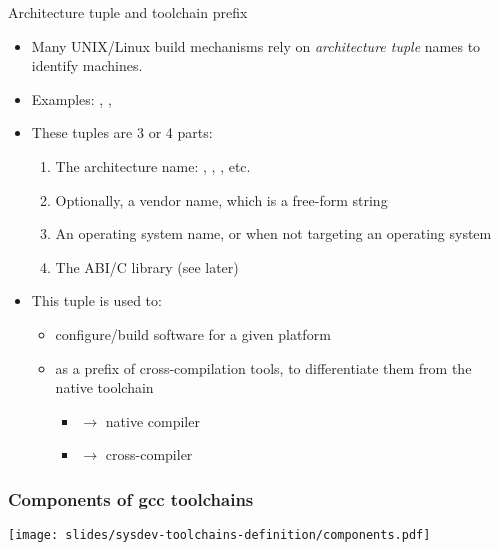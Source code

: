 \begin{frame}{Architecture tuple and toolchain prefix}
  \begin{itemize}
  \item Many UNIX/Linux build mechanisms rely on {\em architecture
      tuple} names to identify machines.
  \item Examples: ,
    , 
  \item These tuples are 3 or 4 parts:
    \begin{enumerate}
    \item The architecture name: , ,
      , etc.
    \item Optionally, a vendor name, which is a free-form string
    \item An operating system name, or  when not targeting
      an operating system
    \item The ABI/C library (see later)
    \end{enumerate}
  \item This tuple is used to:
    \begin{itemize}
    \item configure/build software for a given platform
    \item as a prefix of cross-compilation tools, to differentiate
      them from the native toolchain
      \begin{itemize}
      \item {} $\rightarrow$ native compiler
      \item {} $\rightarrow$ cross-compiler
      \end{itemize}
    \end{itemize}
  \end{itemize}
\end{frame}

\begin{frame}
  \frametitle{Components of gcc toolchains}
  \begin{center}
    \texttt{[image: slides/sysdev-toolchains-definition/components.pdf]}
  \end{center}
\end{frame}

